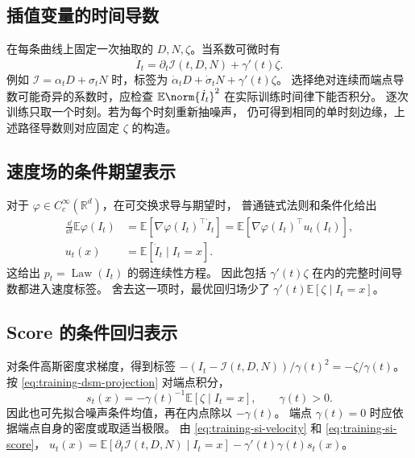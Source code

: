 \subsection{插值变量的时间导数}

在每条曲线上固定一次抽取的 \(D,N,\zeta\)。当系数可微时有
\[
  \dot I_t=\partial_t\mathcal I(t,D,N)+\gamma'(t)\zeta .
\]
例如 \(\mathcal I=\alpha_tD+\sigma_tN\) 时，标签为
\(\dot\alpha_tD+\dot\sigma_tN+\gamma'(t)\zeta\)。
选择绝对连续而端点导数可能奇异的系数时，应检查
\(\mathbb E\norm{\dot I_t}^2\) 在实际训练时间律下能否积分。
逐次训练只取一个时刻。若为每个时刻重新抽噪声，
仍可得到相同的单时刻边缘，上述路径导数则对应固定 \(\zeta\) 的构造。

\subsection{速度场的条件期望表示\requiredderivation}

对于 \(\varphi\in C_c^\infty(\mathbb R^d)\)，在可交换求导与期望时，
普通链式法则和条件化给出
\begin{equation}
  \begin{aligned}
  \frac{\dd}{\dd t}\mathbb E\varphi(I_t)
   &=\mathbb E[\nabla\varphi(I_t)^\top\dot I_t]
    =\mathbb E[\nabla\varphi(I_t)^\top u_t(I_t)],\\
  u_t(x)&=\mathbb E[\dot I_t\mid I_t=x] .
  \end{aligned}
  \label{eq:training-si-velocity}
\end{equation}
这给出 \(p_t=\operatorname{Law}(I_t)\) 的弱连续性方程。
因此包括 \(\gamma'(t)\zeta\) 在内的完整时间导数都进入速度标签。
舍去这一项时，最优回归场少了 \(\gamma'(t)\mathbb E[\zeta\mid I_t=x]\)。

\subsection{Score 的条件回归表示}

对条件高斯密度求梯度，得到标签
\(-(I_t-\mathcal I(t,D,N))/\gamma(t)^2=-\zeta/\gamma(t)\)。
按 \eqref{eq:training-dsm-projection} 对端点积分，
\begin{equation}
  s_t(x)=-\gamma(t)^{-1}\mathbb E[\zeta\mid I_t=x],
  \qquad \gamma(t)>0 .
  \label{eq:training-si-score}
\end{equation}
因此也可先拟合噪声条件均值，再在内点除以 \(-\gamma(t)\)。
端点 \(\gamma(t)=0\) 时应依据端点自身的密度或取适当极限。
由 \eqref{eq:training-si-velocity} 和 \eqref{eq:training-si-score}，
\(u_t(x)=\mathbb E[\partial_t\mathcal I(t,D,N)\mid I_t=x]-\gamma'(t)\gamma(t)s_t(x)\)。

